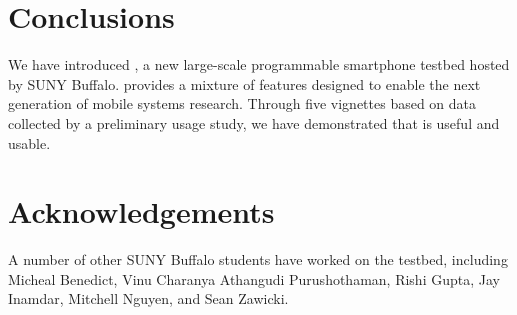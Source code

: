 \section{Conclusions}
\label{sec-conclusions}

We have introduced \PhoneLab{}, a new large-scale programmable smartphone
testbed hosted by SUNY Buffalo. \PhoneLab{} provides a mixture of features
designed to enable the next generation of mobile systems research. Through
five vignettes based on data collected by a preliminary usage study, we have
demonstrated that \PhoneLab{} is useful and usable.

\section*{Acknowledgements}

A number of other SUNY Buffalo students have worked on the \PhoneLab{}
testbed, including Micheal Benedict, Vinu Charanya Athangudi Purushothaman,
Rishi Gupta, Jay Inamdar, Mitchell Nguyen, and Sean Zawicki.
